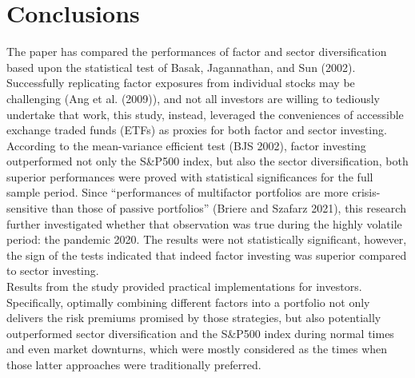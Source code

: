 \section{Conclusions}

The paper has compared the performances of factor and sector diversification based upon the statistical test of Basak, Jagannathan, and Sun (2002). Successfully replicating factor exposures from individual stocks may be challenging (Ang et al. (2009)), and not all investors are willing to tediously undertake that work, this study, instead, leveraged the conveniences of accessible exchange traded funds (ETFs) as proxies for both factor and sector investing.\\
According to the mean-variance efficient test (BJS 2002), factor investing outperformed not only the S&P500 index, but also the sector diversification, both superior performances were proved with statistical significances for the full sample period. Since “performances of multifactor portfolios are more crisis-sensitive than those of passive portfolios” (Briere and Szafarz 2021), this research further investigated whether that observation was true during the highly volatile period: the pandemic 2020. The results were not statistically significant, however, the sign of the tests indicated that indeed factor investing was superior compared to sector investing. \\
Results from the study provided practical implementations for investors. Specifically, optimally combining different factors into a portfolio not only delivers the risk premiums promised by those strategies, but also potentially outperformed sector diversification and the S&P500 index during normal times and even market downturns, which were mostly considered as the times when those latter approaches were traditionally preferred.
